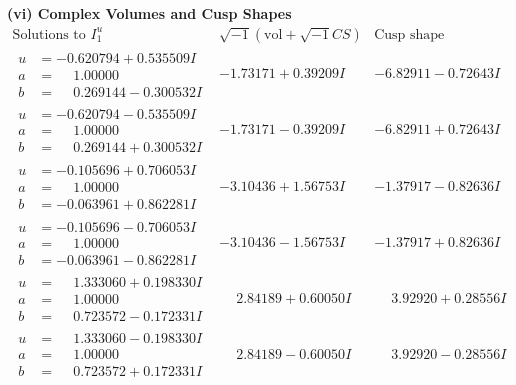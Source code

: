 \documentclass[1p]{elsarticle_modified}
\theoremstyle{definition}
\newcommand{\I}{\sqrt{-1}}
\begin{document}
\newpage\flushleft \textbf{(vi) Complex Volumes and Cusp Shapes}
$$\begin{array}{c|c|c}  
\text{Solutions to }I^u_{1}& \I (\text{vol} + \sqrt{-1}CS) & \text{Cusp shape}\\
 \hline 
\begin{aligned}
u &= -0.620794 + 0.535509 I \\
a &= \phantom{-}1.00000\phantom{ +0.000000I} \\
b &= \phantom{-}0.269144 - 0.300532 I\end{aligned}
 & -1.73171 + 0.39209 I & -6.82911 - 0.72643 I \\ \hline\begin{aligned}
u &= -0.620794 - 0.535509 I \\
a &= \phantom{-}1.00000\phantom{ +0.000000I} \\
b &= \phantom{-}0.269144 + 0.300532 I\end{aligned}
 & -1.73171 - 0.39209 I & -6.82911 + 0.72643 I \\ \hline\begin{aligned}
u &= -0.105696 + 0.706053 I \\
a &= \phantom{-}1.00000\phantom{ +0.000000I} \\
b &= -0.063961 + 0.862281 I\end{aligned}
 & -3.10436 + 1.56753 I & -1.37917 - 0.82636 I \\ \hline\begin{aligned}
u &= -0.105696 - 0.706053 I \\
a &= \phantom{-}1.00000\phantom{ +0.000000I} \\
b &= -0.063961 - 0.862281 I\end{aligned}
 & -3.10436 - 1.56753 I & -1.37917 + 0.82636 I \\ \hline\begin{aligned}
u &= \phantom{-}1.333060 + 0.198330 I \\
a &= \phantom{-}1.00000\phantom{ +0.000000I} \\
b &= \phantom{-}0.723572 - 0.172331 I\end{aligned}
 & \phantom{-}2.84189 + 0.60050 I & \phantom{-}3.92920 + 0.28556 I \\ \hline\begin{aligned}
u &= \phantom{-}1.333060 - 0.198330 I \\
a &= \phantom{-}1.00000\phantom{ +0.000000I} \\
b &= \phantom{-}0.723572 + 0.172331 I\end{aligned}
 & \phantom{-}2.84189 - 0.60050 I & \phantom{-}3.92920 - 0.28556 I \\ \hline\begin{aligned}

\end{aligned}
\end{array}$$
\end{document}
